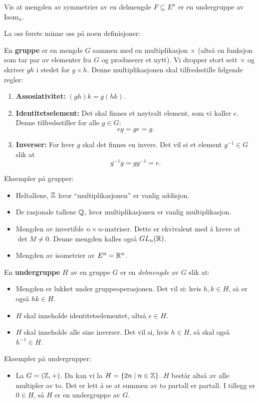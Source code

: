 \documentclass[11pt, norsk]{article}
\begin{document}
\begin{oppg}
Vis at mengden av symmetrier av en delmengde $F \subseteq E^n$ er en undergruppe av $\mathrm{Isom}_n$.
\end{oppg}
\begin{losn}
La oss første minne oss på noen definisjoner:
\begin{defi}
En \textbf{gruppe} er en mengde $G$ sammen med en multiplikasjon $\times$ (altså en funksjon som tar par av elementer fra $G$ og produserer et nytt). Vi dropper stort sett $\times$ og skriver $gh$ i stedet for $g \times h$. Denne multiplikasjonen skal tilfredsstille følgende regler:
\begin{enumerate}
\item \textbf{Assosiativitet:} $(gh)k=g(hk)$.
\item \textbf{Identitetselement:} Det skal finnes et nøytralt element, som vi kaller $e$. Denne tilfredsstiller for alle $g \in G$: $$eg=ge=g.$$
\item \textbf{Inverser:} For hver $g$ skal det finnes en invers. Det vil si et element $g^{-1} \in G$ slik at $$g^{-1}g = gg^{-1} = e.$$
\end{enumerate}
\end{defi}
Eksempler på grupper:
\begin{itemize}
\item Heltallene, $\mathbb{Z}$ hvor ``multiplikasjonen'' er vanlig addisjon.
\item De rasjonale tallene $\mathbb{Q}$, hvor multiplikasjonen er vanlig multiplikasjon. 
\item Mengden av invertible $n \times n$-matriser. Dette er ekvivalent med å kreve at $\det M \neq 0$. Denne mengden kalles også $GL_n(\mathbb{R})$.
\item Mengden av isometrier av $E^n=\mathbb{R}^n$.
\end{itemize}
En \textbf{undergruppe} $H$ av en gruppe $G$ er en \emph{delmengde} av $G$ slik at:
\begin{itemize}
\item Mengden er lukket under gruppeoperasjonen. Det vil si: hvis $h,k \in H$, så er også $hk \in H$.
\item $H$ skal inneholde identitetselementet, altså $e \in H$.
\item $H$ skal inneholde alle sine inverser. Det vil si, hvis $h \in H$, så skal også $h^{-1} \in H$.
\end{itemize}
Eksempler på undergrupper:
\begin{itemize}
\item La $G=(\mathbb{Z},+)$. Da kan vi la $H=\{ 2n \mid n \in \mathbb{Z}\}$. $H$ består altså av alle multipler av to. Det er lett å se at summen av to partall er partall. I tillegg er $0 \in H$, så $H$ er en undergruppe av $G$.

\end{itemize}
\end{losn}
\end{document}
